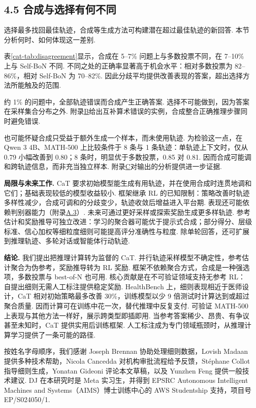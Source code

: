 \subsection*{4.5 合成与选择有何不同}
选择最多找回最佳轨迹，合成等生成方法可构建潜在超过最佳轨迹的新回答. 本节分析何时、如何体现这一差别.

表\ref{cat-tab:disagreement}显示，合成在 5--7\% 问题上与多数投票不同，在 7--10\% 上与 Self-BoN 不同. 不同之处的正确率显著高于机会水平：相对多数投票为 82--86\%，相对 Self-BoN 为 70--82\%. 因此分歧平均提供改善表现的答案，超出选择方法所能触及的范围.

约 1\% 的问题中，全部轨迹错误而合成产生正确答案. 选择不可能做到，因为答案在采样集合分布之外. 附录\hyperref[cat-app:disagree]{B}给出互补算术错误的实例，合成整合正确推理步骤同时避免错误.

也可能怀疑合成只受益于额外生成一个样本，而未使用轨迹. 为检验这一点，在 Qwen 3 4B、MATH-500 上比较条件于 8 条与 1 条轨迹：单轨迹上下文时，仅从 0.79 小幅改善到 0.80；8 条时，明显优于多数投票，0.85 对 0.81. 因而合成可能调和跨轨迹信息，而非充当独立样本. 附录\hyperref[cat-app:analysis]{C}对输出的分析提供进一步证据.


\textbf{局限与未来工作.} CaT 要求初始模型能生成有用轨迹，并在使用合成时连贯地调和它们；基础表现较低的模型收益较小. 框架继承 RL 的已知限制：策略改善时轨迹多样性减少，合成可调和的分歧变少，轨迹收敛后增益进入平台期. 表现还可能依赖判别器能力（附录\hyperref[cat-app:judge-sens]{A.3}）. 未来可通过更好采样或探索奖励\cite{cat-song2025outcome}生成更多样轨迹. 参考估计和奖励推导可独立改进：学习的聚合器可能优于提示式合成；部分得分、层级标准、信心加权等细粒度细则可能提高评分准确性与粒度. 除单轮回答，还可扩展到推理轨迹、多轮对话或智能体行动轨迹.

\textbf{结论.} 我们提出把推理计算转为监督的 CaT. 并行轨迹采样模型不确定性，参考估计聚合为伪参考，奖励推导转为 RL 奖励. 框架不依赖聚合方式，合成是一种强选项，多数投票与 best-of-N 也可用. 核心贡献是在不可验证领域支持无参考 RL：自提出细则无需人工标注提供稳定奖励. HealthBench 上，细则表现相近于医师设计，CaT 相对初始策略最多改善 30\%，训练模型以少 9 倍测试时计算达到或超过聚合质量. 因而计算可在训练中花一次，替代推理中反复支付. 可验证 MATH-500 上表现与其他方法一样好，展示跨类型即插即用. 当参考答案稀少、昂贵、有争议甚至未知时，CaT 提供实用后训练框架. 人工标注成为专门领域瓶颈时，从推理计算学习提供了一条可能的路径.

\label{cat-acknowledgements}
按姓名字母顺序，我们感谢 Joseph Brennan 协助处理细则数据，Lovish Madaan 提供多种技术帮助，Nicola Cancedda 对机构审批流程给予反馈，Stéphane Collot 指导细则生成，Yonatan Gideoni 评论本文草稿，以及 Yunzhen Feng 提供一般技术建议. DJ 在本研究时是 Meta 实习生，并得到 EPSRC Autonomous Intelligent Machines and Systems（AIMS）博士训练中心的 AWS Studentship 支持，项目号 EP/S024050/1.

